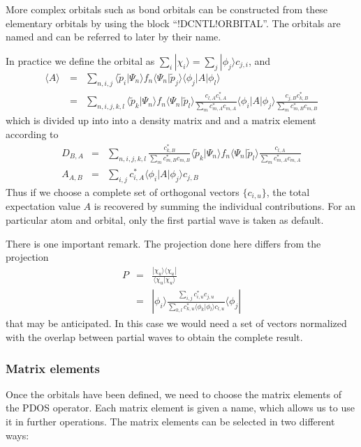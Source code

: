 \documentclass[final,12pt]{article}
\begin{document}
{{{{More complex orbitals such as bond orbitals can be constructed from
these elementary orbitals by using the block ``!DCNTL!ORBITAL''. The
orbitals are named and can be referred to later by their name.

In practice we define the orbital as
$\sum_i|\chi_i\rangle=\sum_j|\phi_j\rangle c_{j,i}$, and
\begin{eqnarray*}
\langle A\rangle\
&=&\sum_{n,i,j}
\langle\tilde{p}_i|\Psi_n\rangle 
f_n\langle\Psi_n|\tilde{p}_j\rangle\langle\phi_j|A|\phi_l\rangle
\\
&=&\sum_{n,i,j,k,l}
\langle\tilde{p}_k|\Psi_n\rangle 
f_n\langle\Psi_n|\tilde{p}_l\rangle
\frac{c_{l,A}c^*_{i,A}}{\sum_m c^*_{m,A}c_{m,A}}
\langle\phi_i|A|\phi_j\rangle
\frac{c_{j,B}c^*_{k,B}}{\sum_m c^*_{m,B}c_{m,B}}
\end{eqnarray*}
which is divided up into into a density matrix and and a matrix
element according to
\begin{eqnarray*}
D_{B,A}&=&\sum_{n,i,j,k,l}
\frac{c^*_{k,B}}{\sum_m c^*_{m,B}c_{m,B}}
\langle\tilde{p}_k|\Psi_n\rangle 
f_n\langle\Psi_n|\tilde{p}_l\rangle
\frac{c_{l,A}}{\sum_m c^*_{m,A}c_{m,A}}
\\
A_{A,B}&=&\sum_{i,j}c^*_{i,A}\langle\phi_i|A|\phi_j\rangle c_{j,B}
\end{eqnarray*}
Thus if we choose a complete set of orthogonal vectors $\{c_{i,u}\}$,
the total expectation value $A$ is recovered by summing the individual
contributions. For an particular atom and orbital, only the first
partial wave is taken as default.

There is one important remark. The projection done here differs from
the projection 
\begin{eqnarray*}
P&=&\frac{|\chi_u\rangle\langle\chi_u|}{\langle\chi_u|\chi_u\rangle}
\\
&=&|\phi_i\rangle 
\frac{\sum_{i,j} c^*_{i,u}c_{j,u}}
{\sum_{k,l}c^*_{k,u}\langle\phi_k|\phi_l\rangle c_{l,u}}\langle\phi_j|
\end{eqnarray*}
that may be anticipated. In this case we would need a set of vectors
normalized with the overlap between partial waves to obtain the
complete result.


\subsubsection{Matrix elements}

Once the orbitals have been defined, we need to choose the matrix
elements of the PDOS operator. Each matrix element is given a name,
which allows us to use it in further operations. The matrix elements
can be selected in two different ways:

}}}}
\end{document}
